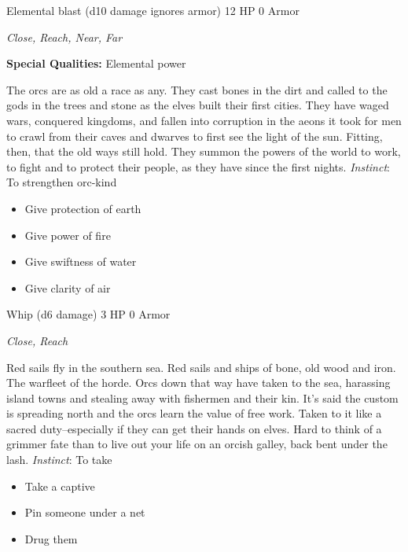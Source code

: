 \HRule
{}

Elemental blast (d10 damage ignores armor)\hspace*{\fill} 12 HP 0 Armor

\emph{Close, Reach, Near, Far}

\textbf{Special Qualities:}
Elemental power

\HRule
The orcs are as old a race as any. They cast bones in the dirt and called to the gods in the trees and stone as the elves built their first cities. They have waged wars, conquered kingdoms, and fallen into corruption in the aeons it took for men to crawl from their caves and dwarves to first see the light of the sun. Fitting, then, that the old ways still hold. They summon the powers of the world to work, to fight and to protect their people, as they have since the first nights. \emph{Instinct}: To strengthen orc-kind
\begin{itemize}
\item Give protection of earth
\item Give power of fire
\item Give swiftness of water
\item Give clarity of air
\end{itemize}

\HRule
{}

Whip (d6 damage)\hspace*{\fill} 3 HP 0 Armor

\emph{Close, Reach}

\HRule
Red sails fly in the southern sea. Red sails and ships of bone, old wood and iron. The warfleet of the horde. Orcs down that way have taken to the sea, harassing island towns and stealing away with fishermen and their kin. It's said the custom is spreading north and the orcs learn the value of free work. Taken to it like a sacred duty--especially if they can get their hands on elves. Hard to think of a grimmer fate than to live out your life on an orcish galley, back bent under the lash. \emph{Instinct}: To take
\begin{itemize}
\item Take a captive
\item Pin someone under a net
\item Drug them
\end{itemize}

\HRule
{}

